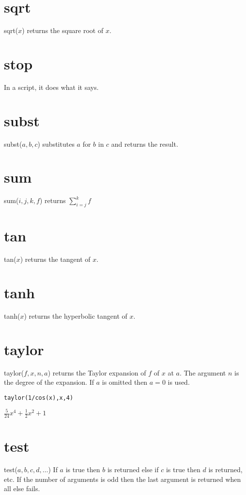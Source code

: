 \section*{sqrt}
sqrt($x$) returns the square root of $x$.

\section*{stop}
In a script, it does what it says.

\section*{subst}
subst($a,b,c$) substitutes $a$ for $b$ in $c$ and returns the result.

\section*{sum}
sum($i,j,k,f$) returns $\displaystyle\sum_{i=j}^k f$

\section*{tan}
tan($x$) returns the tangent of $x$.

\section*{tanh}
tanh($x$) returns the hyperbolic tangent of $x$.

\section*{taylor}
taylor($f,x,n,a$) returns the Taylor expansion of $f$ of $x$ at $a$.
The argument $n$ is the degree of the expansion.
If $a$ is omitted then $a=0$ is used.

\begin{Verbatim}[formatcom=\color{blue},samepage=true]
taylor(1/cos(x),x,4)
\end{Verbatim}

$\displaystyle \frac{5}{24}x^4+\frac{1}{2}x^2+1$

\section*{test}
test($a,b,c,d,\ldots$)
If $a$ is true then $b$ is returned else if $c$ is true then $d$ is returned, etc.
If the number of arguments is odd then the last argument is returned when all else fails.

